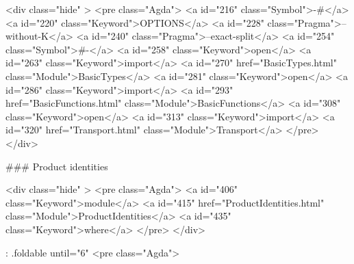   <div class="hide" >
<pre class="Agda">
<a id="216" class="Symbol">{-#</a> <a id="220" class="Keyword">OPTIONS</a> <a id="228" class="Pragma">--without-K</a> <a id="240" class="Pragma">--exact-split</a> <a id="254" class="Symbol">#-}</a>
<a id="258" class="Keyword">open</a> <a id="263" class="Keyword">import</a> <a id="270" href="BasicTypes.html" class="Module">BasicTypes</a>
<a id="281" class="Keyword">open</a> <a id="286" class="Keyword">import</a> <a id="293" href="BasicFunctions.html" class="Module">BasicFunctions</a>
<a id="308" class="Keyword">open</a> <a id="313" class="Keyword">import</a> <a id="320" href="Transport.html" class="Module">Transport</a>
</pre>
</div>

### Product identities

<div class="hide" >
<pre class="Agda">
<a id="406" class="Keyword">module</a>
  <a id="415" href="ProductIdentities.html" class="Module">ProductIdentities</a>
  <a id="435" class="Keyword">where</a>
</pre>
</div>


{: .foldable until="6"}
<pre class="Agda">

